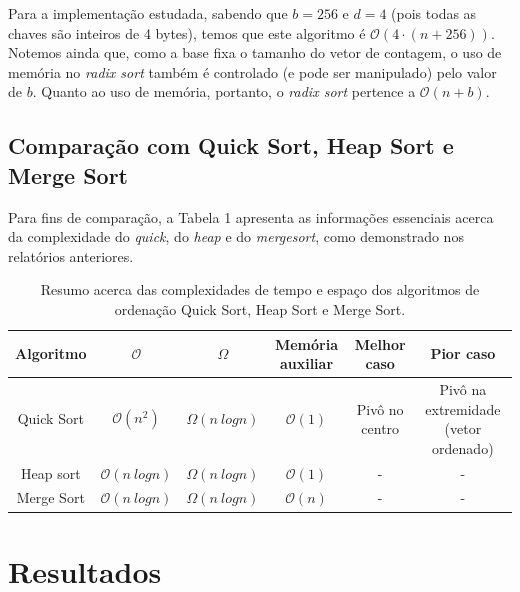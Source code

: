 \documentclass[fontsize=10pt]{article}
\begin{document}
\quad Para a implementação estudada, sabendo que $b = 256$ e $d = 4$ (pois todas as chaves são inteiros de 4 bytes), temos que este algoritmo é $\mathcal{O}(4 \cdot (n + 256))$. Notemos ainda que, como a base fixa o tamanho do vetor de contagem, o uso de memória no \textit{radix sort} também é controlado (e pode ser manipulado) pelo valor de $b$. Quanto ao uso de memória, portanto, o \textit{radix sort} pertence a $\mathcal{O}(n + b)$.

\subsection{Comparação com Quick Sort, Heap Sort e Merge Sort}

\quad Para fins de comparação, a Tabela 1 apresenta as informações essenciais acerca da complexidade do \textit{quick}, do \textit{heap} e do \textit{mergesort}, como demonstrado nos relatórios anteriores\cite{relatorio1}\cite{relatorio2}.

\begin{table}[ht]
\centering
\begin{tabular}{@{}c|c|c|c|c|c@{}}
Algoritmo  & $\mathcal{O}$          & $\Omega$          & Memória auxiliar & Melhor caso    & Pior caso                            \\ \midrule
Quick Sort & $\mathcal{O}(n^2)$     & $\Omega(n\ logn)$ & $\mathcal{O}(1)$ & Pivô no centro & Pivô na extremidade (vetor ordenado) \\
Heap sort  & $\mathcal{O}(n\ logn)$ & $\Omega(n\ logn)$ & $\mathcal{O}(1)$ & -              & -                                    \\
Merge Sort & $\mathcal{O}(n\ logn)$ & $\Omega(n\ logn)$ & $\mathcal{O}(n)$ & -              & -                          
\end{tabular}
\caption{Resumo acerca das complexidades de tempo e espaço dos algoritmos de ordenação Quick Sort, Heap Sort e Merge Sort.}
\label{Tabela 1}
\end{table}

\section{Resultados}
\end{document}
